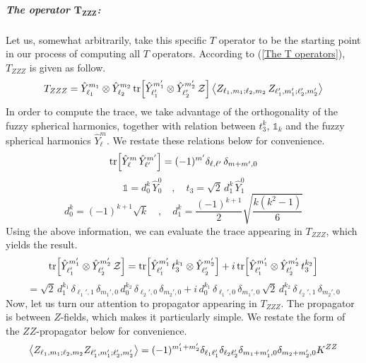 \subparagraph[The operator $T_{ZZZ}$]{The operator $\mathbf{T_{ZZZ}}$:} Let us, somewhat arbitrarily, take this specific $T$ operator to be the starting point in our process of computing all $T$ operators. According to (\ref{The T operators}), $T_{ZZZ}$ is given as follow.
%
%
\begin{equation}
T_{ZZZ} = \hat{Y}_{\ell_1}^{m_1} \otimes \hat{Y}_{\ell_2}^{m_2}
\tr[\hat{Y}_{\ell_1'}^{m_1'} \otimes \hat{Y}_{\ell_2'}^{m_2'} \, \mathcal{Z}]
\expval{Z_{\ell_1, m_1; \ell_2, m_2} \, Z_{\ell_1', m_1'; \ell_2', m_2'}}
\end{equation}
%
%
In order to compute the trace, we take advantage of the orthogonality of the fuzzy spherical harmonics, together with relation between $t_3^k$, $\mathbb{1}_k$ and the fuzzy spherical harmonics $\hat{Y}_{\ell}^{m}$. We restate these relations below for convenience.
%
%
\begin{equation}\label{orthogonality}
\tr[\hat{Y}_{\ell}^{m} \, \hat{Y}_{\ell'}^{m'}]
=
(-1)^{m'} \delta_{\ell, \ell'} \, \delta_{m + m',0}
\end{equation}
%
%
\begin{equation}
\mathbb{1} = d_0^k \, \hat{Y}^{0}_{0}
%
\quad , \quad
%
t_3 = \sqrt{2} \, d_1^k \, \hat{Y}^{0}_{1}
\end{equation}
%
%
\begin{equation}
d_0^k = (-1)^{k+1} \sqrt{k}
%
\quad , \quad
%
d_1^k = \frac{(-1)^{k+1}}{2} \sqrt{\frac{k(k^2-1)}{6}}
\end{equation}
%
%
Using the above information, we can evaluate the trace appearing in $T_{ZZZ}$, which yields the result.
%
%
\begin{equation*}
\tr[\hat{Y}_{\ell_1'}^{m_1'} \otimes \hat{Y}_{\ell_2'}^{m_2'} \, \mathcal{Z}]
=
\tr[\hat{Y}_{\ell_1'}^{m_1'} \, t_3^{k_1} \otimes \hat{Y}_{\ell_2'}^{m_2'} ]
+
i \tr[\hat{Y}_{\ell_1'}^{m_1'} \otimes \hat{Y}_{\ell_2'}^{m_2'} \, t_3^{k_2} ]
\end{equation*}
%
%
\begin{equation}\label{Z-trace}
=
\sqrt{2} \, d_1^{k_1} \, \delta_{\ell_1',1} \, \delta_{m_1',0} \,
d_0^{k_2} \, \delta_{\ell_2',0} \, \delta_{m_2',0}
+
i \, d_0^{k_1} \, \delta_{\ell_1',0} \, \delta_{m_1',0} \, 
\sqrt{2} \, d_1^{k_2} \, \delta_{\ell_2',1} \, \delta_{m_2',0}
\end{equation}
%
%
Now, let us turn our attention to propagator appearing in $T_{ZZZ}$. The propagator is between $Z$-fields, which makes it particularly simple. We restate the form of the $ZZ$-propagator below for convenience.
%
%
\begin{equation}
\expval{
Z_{\ell_1,m_1;\ell_2,m_2}
Z_{\ell_1',m_1';\ell_2',m_2'}
}
=
(-1)^{m_1' + m_2'}
\delta_{\ell_1 \ell_1'} \delta_{\ell_2 \ell_2'}
\delta_{m_1+m_1',0} \delta_{m_2 + m_2',0}
K^{ZZ}
\end{equation}
%
%

